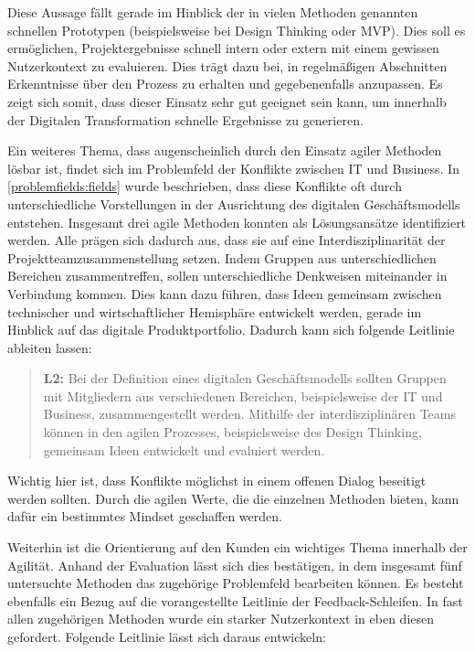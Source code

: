 Diese Aussage fällt gerade im Hinblick der in vielen Methoden genannten schnellen Prototypen (beispielsweise bei Design Thinking oder MVP). Dies soll es ermöglichen, Projektergebnisse schnell intern oder extern mit einem gewissen Nutzerkontext zu evaluieren. Dies trägt dazu bei, in regelmäßigen Abschnitten Erkenntnisse über den Prozess zu erhalten und gegebenenfalls anzupassen. Es zeigt sich somit, dass dieser Einsatz sehr gut geeignet sein kann, um innerhalb der Digitalen Transformation schnelle Ergebnisse zu generieren.

Ein weiteres Thema, dass augenscheinlich durch den Einsatz agiler Methoden lösbar ist, findet sich im Problemfeld der Konflikte zwischen IT und Business. In \ref{problemfields:fields} wurde beschrieben, dass diese Konflikte oft durch unterschiedliche Vorstellungen in der Ausrichtung des digitalen Geschäftsmodells entstehen. Insgesamt drei agile Methoden konnten als Lösungsansätze identifiziert werden. Alle prägen sich dadurch aus, dass sie auf eine Interdisziplinarität der Projektteamzusammenstellung setzen. Indem Gruppen aus unterschiedlichen Bereichen zusammentreffen, sollen unterschiedliche Denkweisen miteinander in Verbindung kommen. Dies kann dazu führen, dass Ideen gemeinsam zwischen technischer und wirtschaftlicher Hemisphäre entwickelt werden,  gerade im Hinblick auf das digitale Produktportfolio. Dadurch kann sich folgende Leitlinie ableiten lassen:

\begin{quote}
	\textbf{L2:} Bei der Definition eines digitalen Geschäftsmodells sollten Gruppen mit Mitgliedern aus verschiedenen Bereichen, beispielsweise der IT und Business, zusammengestellt werden. Mithilfe der interdisziplinären Teams können in den agilen Prozesses, beispielsweise des Design Thinking, gemeinsam Ideen entwickelt und evaluiert werden.
\end{quote}

Wichtig hier ist, dass Konflikte möglichst in einem offenen Dialog beseitigt werden sollten. Durch die agilen Werte, die die einzelnen Methoden bieten, kann dafür ein bestimmtes Mindset geschaffen werden.

Weiterhin ist die Orientierung auf den Kunden ein wichtiges Thema innerhalb der Agilität. Anhand der Evaluation lässt sich dies bestätigen, in dem insgesamt fünf untersuchte Methoden das zugehörige Problemfeld bearbeiten können. Es besteht ebenfalls ein Bezug auf die vorangestellte Leitlinie der Feedback-Schleifen. In fast allen zugehörigen Methoden wurde ein starker Nutzerkontext in eben diesen gefordert. Folgende Leitlinie lässt sich daraus entwickeln:

